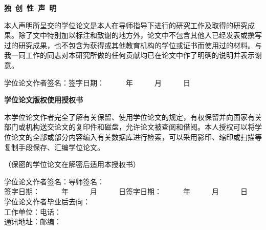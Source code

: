 \begin{titlepage}
\begin{center}
    \song\textbf{独~创~性~声~明}
\end{center}
\par 本人声明所呈交的学位论文是本人在导师指导下进行的研究工作及取得的研究成果。除了文中特别加以标注和致谢的地方外，论文中不包含其他人已经发表或撰写过的研究成果，也不包含为获得\song 或其他教育机构的学位或证书而使用过的材料。与我一同工作的同志对本研究所做的任何贡献均已在论文中作了明确的说明并表示谢意。\\[25pt]
\par 学位论文作者签名：\hspace{115pt}签字日期：~~~~~~年~~~~~~月~~~~~~日\\[25pt]
\begin{center}
    \song{}\textbf{学位论文版权使用授权书}
\end{center}
\par 本学位论文作者完全了解\song 有关保留、使用学位论文的规定，有权保留并向国家有关部门或机构送交论文的复印件和磁盘，允许论文被查阅和借阅。本人授权\song 可以将学位论文的全部或部分内容编入有关数据库进行检索，可以采用影印、缩印或扫描等复制手段保存、汇编学位论文。
\par （保密的学位论文在解密后适用本授权书）\\[25pt]
\begin{flushleft}
学位论文作者签名：\hspace{135pt}导师签名：\\
签字日期：~~~~~~年~~~~~~月~~~~~~日\hspace{95pt}签字日期：~~~~~~年~~~~~~月~~~~~~日\\
学位论文作者毕业后去向：\\
工作单位：\hspace{185pt}电话：\\
通讯地址：\hspace{185pt}邮编：\\
\end{flushleft}
\end{titlepage}


